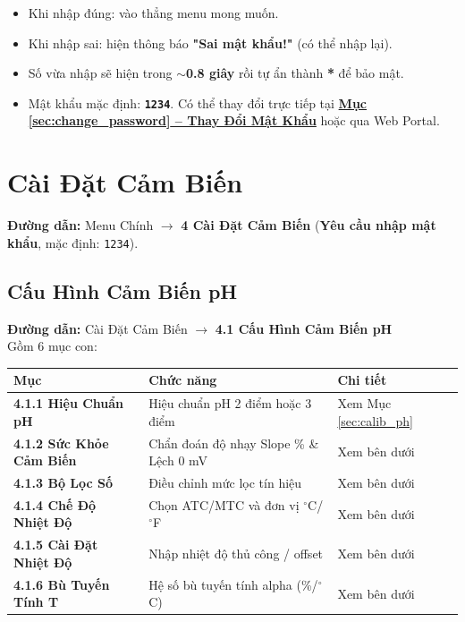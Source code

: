 \documentclass[12pt,a4paper]{article}
\begin{document}
\begin{notebox}
\begin{itemize}[label={-}]
    \item Khi nhập đúng: vào thẳng menu mong muốn.
    \item Khi nhập sai: hiện thông báo \textbf{"Sai mật khẩu!"} (có thể nhập lại).
    \item Số vừa nhập sẽ hiện trong \textbf{$\sim$0.8 giây} rồi tự ẩn thành \textbf{*} để bảo mật.
    \item Mật khẩu mặc định: \textbf{\texttt{1234}}. Có thể thay đổi trực tiếp tại \hyperref[sec:change_password]{\textbf{Mục \ref*{sec:change_password} -- Thay Đổi Mật Khẩu}} hoặc qua Web Portal.
\end{itemize}
\end{notebox}


\section{Cài Đặt Cảm Biến}

\textbf{Đường dẫn:} Menu Chính $\rightarrow$ \textbf{4 Cài Đặt Cảm Biến}
(\textbf{Yêu cầu nhập mật khẩu}, mặc định: \texttt{1234}).

\subsection{Cấu Hình Cảm Biến pH}
\textbf{Đường dẫn:} Cài Đặt Cảm Biến $\rightarrow$ \textbf{4.1 Cấu Hình Cảm Biến pH}\\
Gồm 6 mục con:

\begin{table}[H]
\centering
\begin{tabularx}{\textwidth}{|l|l|X|}
\hline
\textbf{Mục} & \textbf{Chức năng} & \textbf{Chi tiết} \\ \hline
\textbf{4.1.1 Hiệu Chuẩn pH} & Hiệu chuẩn pH 2 điểm hoặc 3 điểm & Xem Mục \ref{sec:calib_ph} \\ \hline
\textbf{4.1.2 Sức Khỏe Cảm Biến} & Chẩn đoán độ nhạy Slope \% \& Lệch 0 mV & Xem bên dưới \\ \hline
\textbf{4.1.3 Bộ Lọc Số} & Điều chỉnh mức lọc tín hiệu & Xem bên dưới \\ \hline
\textbf{4.1.4 Chế Độ Nhiệt Độ} & Chọn ATC/MTC và đơn vị $^\circ$C/$^\circ$F & Xem bên dưới \\ \hline
\textbf{4.1.5 Cài Đặt Nhiệt Độ} & Nhập nhiệt độ thủ công / offset & Xem bên dưới \\ \hline
\textbf{4.1.6 Bù Tuyến Tính T} & Hệ số bù tuyến tính alpha (\%/$^\circ$C) & Xem bên dưới \\ \hline
\end{tabularx}
\end{table}
\end{document}
